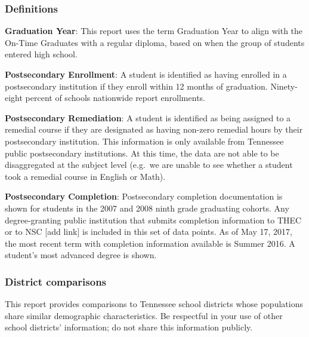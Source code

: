 \documentclass[11pt,]{article}
\begin{document}
\newpage 

\newpage  

\subsubsection{Definitions}\label{definitions}

\textbf{Graduation Year}: This report uses the term Graduation Year to
align with the On-Time Graduates with a regular diploma, based on when
the group of students entered high school.

\textbf{Postsecondary Enrollment}: A student is identified as having
enrolled in a postsecondary institution if they enroll within 12 months
of graduation. Ninety-eight percent of schools nationwide report
enrollments.

\textbf{Postsecondary Remediation}: A student is identified as being
assigned to a remedial course if they are designated as having non-zero
remedial hours by their postsecondary institution. This information is
only available from Tennessee public postsecondary institutions. At this
time, the data are not able to be disaggregated at the subject level
(e.g.~we are unable to see whether a student took a remedial course in
English or Math).

\textbf{Postsecondary Completion}: Postsecondary completion
documentation is shown for students in the 2007 and 2008 ninth grade
graduating cohorts. Any degree-granting public institution that submits
completion information to THEC or to NSC {[}add link{]} is included in
this set of data points. As of May 17, 2017, the most recent term with
completion information available is Summer 2016. A student's most
advanced degree is shown.

\subsubsection{District comparisons}\label{district-comparisons}

This report provides comparisons to Tennessee school districts whose
populations share similar demographic characteristics. Be respectful in
your use of other school districts' information; do not share this
information publicly.
\end{document}
